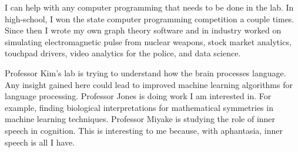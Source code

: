 \documentclass{article}
\begin{document}
I can help with any computer programming that needs to be done in the lab. In high-school, I won the state computer programming competition a couple times. Since then I wrote my own graph theory software and in industry worked on simulating electromagnetic pulse from nuclear weapons, stock market analytics, touchpad drivers, video analytics for the police, and data science. 

Professor Kim's lab is trying to understand how the brain processes language.  Any insight gained here could lead to improved machine learning algorithms for language processing.
Professor Jones is doing work I am interested in. For example, finding biological interpretations for mathematical symmetries in machine learning techniques.
Professor Miyake is studying the role of inner speech in cognition.  This is interesting to me because, with aphantasia, inner speech is all I have.
\end{document}
